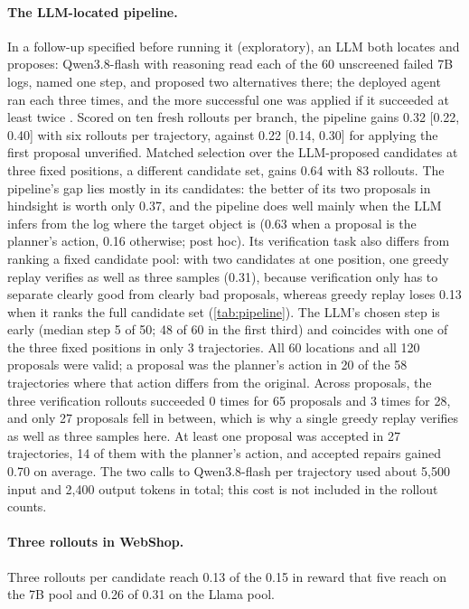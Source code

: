 \documentclass{article}
\theoremstyle{plain}
\theoremstyle{definition}
\theoremstyle{remark}
\begin{document}
\paragraph{The LLM-located pipeline.}
In a follow-up specified before running it (exploratory), an LLM both locates and proposes: Qwen3.8-flash with reasoning read each of the 60 unscreened failed 7B logs, named one step, and proposed two alternatives there; the deployed agent ran each three times, and the more successful one was applied if it succeeded at least twice \citep{ma2025dover}. Scored on ten fresh rollouts per branch, the pipeline gains 0.32 [0.22, 0.40] with six rollouts per trajectory, against 0.22 [0.14, 0.30] for applying the first proposal unverified. Matched selection over the LLM-proposed candidates at three fixed positions, a different candidate set, gains 0.64 with 83 rollouts. The pipeline's gap lies mostly in its candidates: the better of its two proposals in hindsight is worth only 0.37, and the pipeline does well mainly when the LLM infers from the log where the target object is (0.63 when a proposal is the planner's action, 0.16 otherwise; post hoc). Its verification task also differs from ranking a fixed candidate pool: with two candidates at one position, one greedy replay verifies as well as three samples (0.31), because verification only has to separate clearly good from clearly bad proposals, whereas greedy replay loses 0.13 when it ranks the full candidate set (\cref{tab:pipeline}).
The LLM's chosen step is early (median step 5 of 50; 48 of 60 in the first third) and coincides with one of the three fixed positions in only 3 trajectories. All 60 locations and all 120 proposals were valid; a proposal was the planner's action in 20 of the 58 trajectories where that action differs from the original. Across proposals, the three verification rollouts succeeded 0 times for 65 proposals and 3 times for 28, and only 27 proposals fell in between, which is why a single greedy replay verifies as well as three samples here. At least one proposal was accepted in 27 trajectories, 14 of them with the planner's action, and accepted repairs gained 0.70 on average. The two calls to Qwen3.8-flash per trajectory used about 5,500 input and 2,400 output tokens in total; this cost is not included in the rollout counts.

\paragraph{Three rollouts in WebShop.}
Three rollouts per candidate reach 0.13 of the 0.15 in reward that five reach on the 7B pool and 0.26 of 0.31 on the Llama pool.
\end{document}
